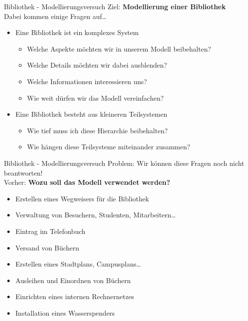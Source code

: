 \documentclass[18pt]{beamer}
\begin{document}
\begin{frame}{Bibliothek - Modellierungsversuch}
    Ziel: \textbf{Modellierung einer Bibliothek}\\
    \vspace{.1in}
    Dabei kommen einige Fragen auf\dots
    \pause
    \begin{itemize}
        \item Eine Bibliothek ist ein komplexes System
        \begin{itemize}
            \item Welche Aspekte möchten wir in unserem Modell beibehalten?
            \item Welche Details möchten wir dabei ausblenden?
            \item Welche Informationen interessieren uns?
            \item Wie weit dürfen wir das Modell vereinfachen?
        \end{itemize}
        \pause
        \item Eine Bibliothek besteht aus kleineren Teilsystemen
        \begin{itemize}
            \item Wie tief muss ich diese Hierarchie beibehalten?
            \item Wie hängen diese Teilsysteme miteinander zusammen?
        \end{itemize}
    \end{itemize}
\end{frame}

\begin{frame}{Bibliothek - Modellierungsversuch}
    Problem: Wir können diese Fragen noch nicht beantworten!\\
    Vorher: \textbf{Wozu soll das Modell verwendet werden?}
    \pause
    \begin{itemize}
        \item Erstellen eines Wegweisers für die Bibliothek
        \item Verwaltung von Besuchern, Studenten, Mitarbeitern\dots
        \item Eintrag im Telefonbuch
        \item Versand von Büchern
        \item Erstellen eines Stadtplans, Campusplans\dots
        \item Ausleihen und Einordnen von Büchern
        \item Einrichten eines internen Rechnernetzes
        \item Installation eines Wasserspenders
    \end{itemize}
\end{frame}
\end{document}
